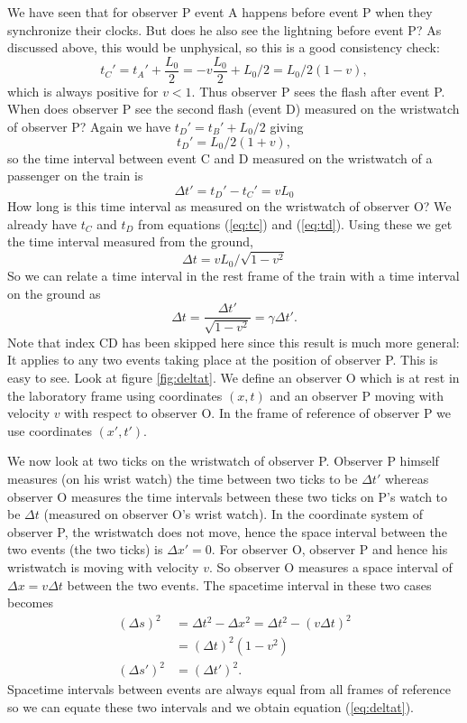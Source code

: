 {\begin{multicols}{2}
We have seen that for observer P event A happens before event P when they synchronize their clocks. But does he also see the lightning before event P? As discussed above, this would be unphysical, so this is a good consistency check:
\[
t_C'=t_A'+\frac{L_0}{2}=-v\frac{L_0}{2}+L_0/2=L_0/2(1-v),
\]
which is always positive for $v<1$. Thus observer P sees the flash after event P. When does observer P see the second flash (event D) measured on the wristwatch of observer P? Again we have $t_D'=t_B'+L_0/2$ giving
\[
t_D'=L_0/2(1+v),
\]
so the time interval between event C and D measured on the wristwatch of a passenger on the train is
\[
\Delta t'=t_D'-t_C'=vL_0
\]
How long is this time interval as measured on the wristwatch of observer O? We already have $t_C$ and $t_D$ from equations (\ref{eq:tc}) and (\ref{eq:td}). Using these we get the time interval measured from the ground,
\[
\Delta t=vL_0/\sqrt{1-v^2}
\]
So we can relate a time interval in the rest frame of the train with a time interval on the ground as
\begin{equation}
\label{eq:deltat}
\Delta t=\frac{\Delta t'}{\sqrt{1-v^2}}=\gamma \Delta t'.
\end{equation}
Note that index CD has been skipped here since this result is much more general: It applies to any two events taking place at the position of observer P. This is easy to see. Look at figure \ref{fig:deltat}. We define an observer O which is at rest in the laboratory frame using coordinates $(x,t)$ and an observer P moving with velocity $v$ with respect to observer O. In the frame of reference of observer P we use coordinates $(x',t')$. 

We now look at two ticks on the wristwatch of observer P. Observer P himself measures (on his wrist watch) the time between two ticks to be $\Delta t'$ whereas observer O measures the time intervals between these two ticks on P's watch to be $\Delta t$ (measured on observer O's wrist watch). In the coordinate system of observer P, the wristwatch does not move, hence the space interval between the two events (the two ticks) is $\Delta x'=0$. For observer O, observer P and hence his wristwatch is moving with velocity $v$. So observer O measures a space interval of $\Delta x=v\Delta t$ between the two events. The spacetime interval in these two cases becomes
\begin{align*}
(\Delta s)^2&=\Delta t^2-\Delta x^2=\Delta t^2-(v\Delta t)^2\\
&=(\Delta t)^2(1-v^2)\\
(\Delta s')^2&=(\Delta t')^2.
\end{align*}
Spacetime intervals between events are always equal from all frames of reference so we can equate these two intervals and we obtain equation (\ref{eq:deltat}).


\end{multicols}}
